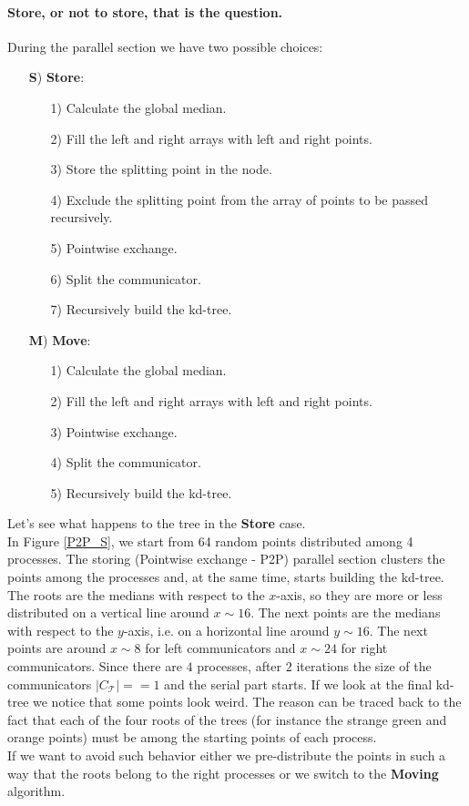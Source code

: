 \documentclass[amssymb, aps,nofootinbib, superscriptaddress, notitlepage]{revtex4}
\begin{document}
\paragraph*{ Store, or not to store, that is the question.} 
During the parallel section we have two possible choices:
\begin{enumerate}
\item[\textbf{S})] \textbf{Store}:
\begin{enumerate}
\item[1)] Calculate the  global median.
\item[2)] Fill the left and right arrays with left and right points.
\item[3)] Store the splitting point in the node.
\item[4)] Exclude the splitting point from the array of points to be passed recursively.
\item[5)] Pointwise exchange. 
\item[6)] Split the communicator.
\item[7)] Recursively build the kd-tree.
\end{enumerate} 

\item[\textbf{M})] \textbf{Move}:
\begin{enumerate}
\item[1)] Calculate the  global median.
\item[2)] Fill the left and right arrays with left and right points.
\item[3)] Pointwise exchange. 
\item[4)] Split the communicator.
\item[5)] Recursively build the kd-tree.
\end{enumerate} 
\end{enumerate}

Let's see what happens to the tree in the \textbf{Store} case.  
\\
In Figure \ref{P2P_S}, we start from 64 random points distributed among 4 processes. The storing (Pointwise exchange - P2P) parallel section clusters the points among the processes and, at the same time, starts building the kd-tree.
The roots are the medians with respect to the $x$-axis, so they are more or less distributed on a vertical line around $x\sim 16$. 
The next points are the medians with respect to  the $y$-axis, i.e. on a horizontal line around $y\sim 16$. 
The next points are around $x\sim 8$ for left communicators and $x\sim 24$ for right communicators. 
Since there are $4$ processes, after $2$ iterations the size of the communicators $|C_\mathcal{T}|==1$ and the serial part starts. 
If we look at the final kd-tree we notice that some points look weird. 
The reason can be traced back to the fact that each of the four roots of the trees (for instance the strange green and orange points) must be among the starting points of each process. 
\\
If we want to avoid such behavior either we pre-distribute the points in such a way that the roots belong to the right processes or we switch to the \textbf{Moving} algorithm.
\end{document}
